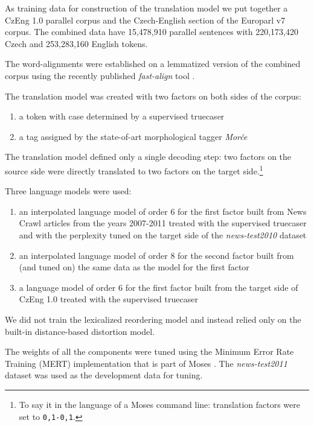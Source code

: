As training data for construction of the translation model we put together a CzEng 1.0
parallel corpus \citep{czeng10:lrec2012}
and the Czech-English section of the Europarl v7 corpus.
The combined data have 15,478,910 parallel sentences with 220,173,420 Czech and 253,283,160
English tokens.

The word-alignments were established on a lemmatized version of the combined corpus using
the recently published \emph{fast-align} tool \citep{dyer:fastalign}.

The translation model was created with two factors on both sides of the corpus:
\begin{enumerate}
  \item a token with case determined by a supervised truecaser
  \item a tag assigned by the state-of-art morphological tagger \emph{Morče}
\end{enumerate}

The translation model defined only a single decoding step: two factors on the source side
were directly translated to two factors on the target side.\footnote{To say it in the language
of a Moses command line: translation factors were set to \texttt{0,1-0,1}.}

Three language models were used:
\begin{enumerate}
  \item an interpolated language model of order 6 for the first factor built from News Crawl
    articles from the years 2007-2011 treated with the supervised truecaser and with the perplexity tuned
    on the target side of the \emph{news-test2010} dataset
  \item an interpolated language model of order 8 for the second factor built from (and tuned
    on) the same data as the model for the first factor
  \item a language model of order 6 for the first factor built from the target side of CzEng 1.0
    treated with the supervised truecaser
\end{enumerate}

We did not train the lexicalized reordering model and instead relied only on the built-in
distance-based distortion model.

The weights of all the components were tuned using the Minimum Error Rate Training (MERT)
implementation that is part of Moses \citep{bertoldi:mert}.
The \emph{news-test2011} dataset was used as the development data for tuning.


